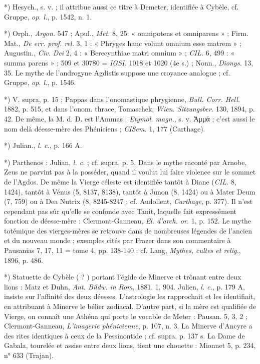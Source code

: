\documentclass[a4paper, 11pt, oneside, polutonikogreek, french]{article}
\begin{document}
*) Hesych., s. v. ; il attribue aussi ce titre à Demeter, identifiée à Cybèle, cf. Gruppe, \emph{op. l.}, p. 1542, n. 1.

*) Orph., \emph{Argon.} 547 ; Apul., \emph{Met.} 8, 25: « omnipotens et omniparens » ; Firm. Mat., \emph{De err. prof. rel.} 3, 1 : « Phryges hanc volunt omnium esse matrem » ; Augustin., \emph{Civ. Dei} 2, 4 : « Berecynthiae matri omnium » ; \emph{CIL.} 6, 499 : « summa parens » ; 509 et 30780 = \emph{IGSI.} 1018 et 1020 (4e s.) ; Nonn., \emph{Dionys.} 13, 35. Le mythe de l'androgyne Agdistis suppose une croyance analogue ; cf. Gruppe, \emph{op. l.}, p. 1546.

*) V. supra, p. 15 ; Pappas dans l'onomastique phrygienne, \emph{Bull. Corr. Hell.} 1882, p. 515, et dans l'onom. thrace, Tomaschek, \emph{Wien. Sitzungsber.} 130, 1894, p. 42. De même, la M. d. D. est l'Ammas : \emph{Etymol. magn.}, s. v.  Ἀμμά ; c'est aussi le nom delà déesse-mère des Phéniciens ; \emph{CISem.} 1, 177 (Carthage).

*) Julian., \emph{l. c.}, p. 166 A.

*) Parthenos : Julian, \emph{l. c.} ; cf. supra, p. 5. Dans le mythe raconté par Arnobe, Zeus ne parvint pas à la posséder, quand il voulut lui faire violence sur le sommet de l'Agdos. De même la Vierge céleste est identifiée tantôt à Diane (\emph{CIL.} 8, 1424), tantôt à Vénus (5, 8137, 8138), tantôt à Junon (8, 1424) ou à Mater Deum (7, 759) ou à Dea Nutrix (8, 8245-8247 ; cf. Audollent, \emph{Carthage}, p. 377). Il n'est cependant pas sûr qu'elle se confonde avec Tanit, laquelle fait expressément fonction de déesse-mère : Clermont-Ganneau, \emph{El. d'arch. or.} 1, p. 152. Le mythe totémique des vierges-mères se retrouve dans de nombreuses légendes de l'ancien et du nouveau monde ; exemples cités par Frazer dans son commentaire à Pausanias 7, 17, 11 = tome 4, pp. 138-140 ; cf. Lang, \emph{Mythes, cultes et relig.}, 1896, p. 486.

*) Statuette de Cybèle ( ? ) portant l'égide de Minerve et trônant entre deux lions : Matz et Duhn, \emph{Ant. Bildw. in Rom}, 1881, 1, 904. Julien, \emph{l. c.}, p. 179 A, insiste sur l'affinité des deux déesses. L'astrologie les rapprochait et les identifiait, en attribuant à Minerve le bélier zodiacal. D'autre part, si la mère est qualifiée de Vierge, on connaît une Athéna qui porte le vocable de Meter : Pausan. 5, 3, 2 ; Clermont-Ganneau, \emph{L'imagerie phénicienne}, p. 107, n. 3. La Minerve d'Ancyre a des rites identiques à ceux de la Pessinontide ; cf. supra, p. 137 s. La Dame de Gabala, tourelée et assise entre deux lions, tient une chouette : Mionnet 5, p. 234, n° 633 (Trajan).
\end{document}

